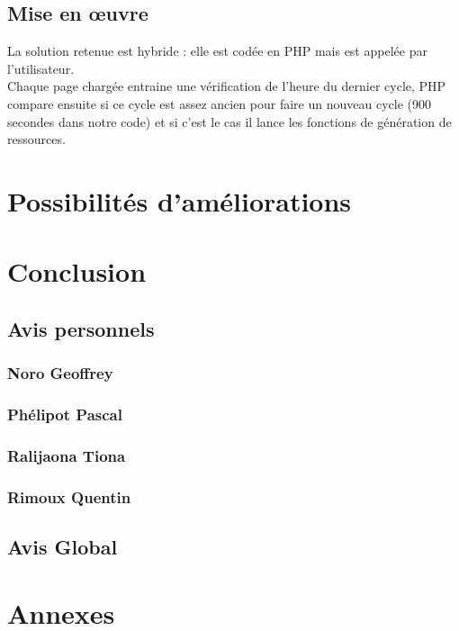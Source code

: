 \documentclass[11pt,a4paper]{article}
\begin{document}
\subsection{Mise en œuvre}
La solution retenue est hybride : elle est codée en PHP mais est appelée par l'utilisateur. \\
Chaque page chargée entraine une vérification de l'heure du dernier cycle, PHP compare ensuite si ce cycle est assez ancien pour faire un nouveau cycle (900 secondes dans notre code) et si c'est le cas il lance les fonctions de génération de ressources.

\newpage\section{Possibilités d'améliorations}

\newpage\section{Conclusion}
\subsection{Avis personnels}
\subsubsection{Noro Geoffrey}
\subsubsection{Phélipot Pascal}

\subsubsection{Ralijaona Tiona}
\subsubsection{Rimoux Quentin}
\subsection{Avis Global}

\newpage{}
\section{Annexes}
\end{document}
